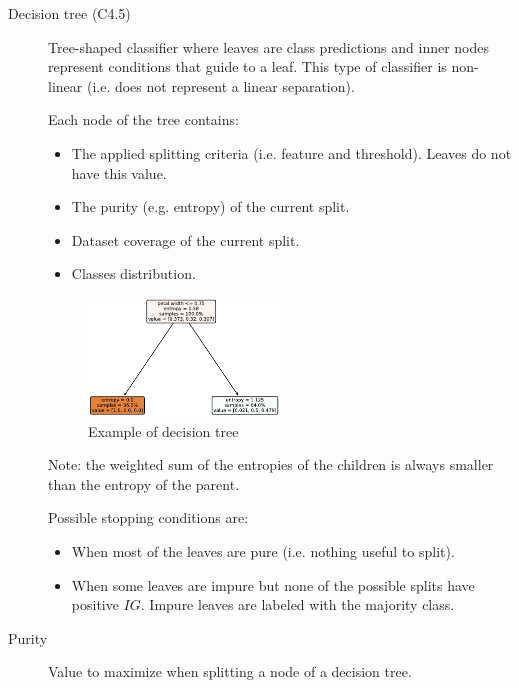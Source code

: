 \begin{description}
    \item[Decision tree (C4.5)] 
        Tree-shaped classifier where leaves are class predictions and 
        inner nodes represent conditions that guide to a leaf.
        This type of classifier is non-linear (i.e. does not represent a linear separation).

        Each node of the tree contains:
        \begin{itemize}
            \item The applied splitting criteria (i.e. feature and threshold). 
                Leaves do not have this value.
            \item The purity (e.g. entropy) of the current split.
            \item Dataset coverage of the current split.
            \item Classes distribution.
        \end{itemize}

        \begin{figure}[h]
            \centering
            \includegraphics[width=0.5\textwidth]{img/_iris_decision_tree_example.pdf}
            \caption{Example of decision tree}
        \end{figure}

        Note: the weighted sum of the entropies of the children is always smaller than the entropy of the parent.

        Possible stopping conditions are:
        \begin{itemize}
            \item When most of the leaves are pure (i.e. nothing useful to split).
            \item When some leaves are impure but none of the possible splits have positive $IG$.
                Impure leaves are labeled with the majority class.
        \end{itemize}

    \item[Purity] 
        Value to maximize when splitting a node of a decision tree.


\end{description}
